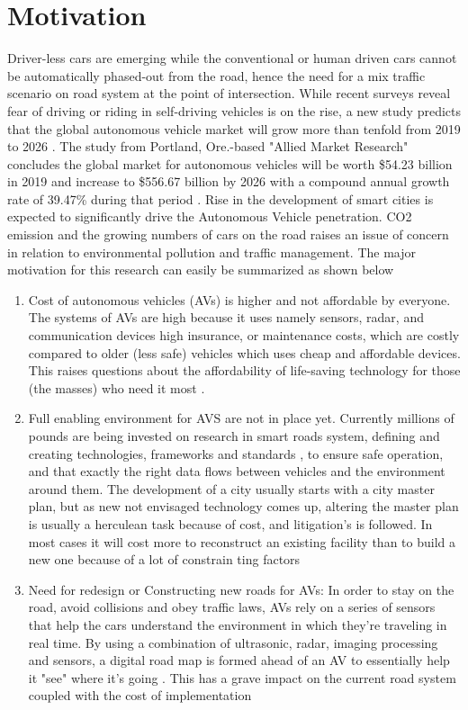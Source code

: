 \documentclass{book}
\begin{document}
\section{Motivation}
\label{sec:motivation}
Driver-less cars are emerging while the conventional or human driven cars cannot be automatically phased-out from the road, hence the need for a mix traffic scenario on road system at the point of intersection. While recent surveys reveal fear of driving or riding in self-driving vehicles is on the rise, a new study predicts that the global autonomous vehicle market will grow more than tenfold from 2019 to 2026 \cite{yun2016relationship}.
The study from Portland, Ore.-based "Allied Market Research"  concludes  the global market for autonomous vehicles will be worth \$54.23 billion in 2019 and increase to \$556.67 billion by 2026 with a compound annual growth rate of 39.47\% during that period \cite{krasniqi2016use, williams2019reliance}. Rise in the development of smart cities is expected to significantly drive the Autonomous Vehicle penetration. CO2 emission and the growing numbers of cars on the road raises an issue of concern in relation to environmental pollution and traffic management. The major motivation for this research can easily be summarized as shown below
\begin{enumerate}
   \item Cost of autonomous vehicles (AVs) is higher and not affordable by everyone. The systems of AVs are high because it uses namely sensors, radar, and communication devices high insurance, or maintenance costs, which are costly compared to older (less safe) vehicles which uses cheap and affordable devices. This raises questions about the affordability of life-saving technology for those (the masses) who need it most \cite{wadud2017fully, childress2015using}.
   \item Full enabling environment for AVS are not in place yet. Currently millions of pounds are being invested on research in smart roads system, defining and creating technologies, frameworks and standards \cite{fagnant2015preparing}, to ensure safe operation, and that exactly the right data flows between vehicles and the environment around them. The development of a city usually starts with a city master plan, but as new not envisaged technology comes up, altering the master plan is usually a herculean task because of cost, and litigation's is followed. In most cases it will cost more to reconstruct an existing facility than to build a new one because of a lot of constrain ting factors \cite{legacy2019planning, bahamonde2018systemic}
   \item Need for redesign or Constructing new roads for AVs: In order to stay on the road, avoid collisions and obey traffic laws, AVs rely on a series of sensors that help the cars understand the environment in which they're traveling in real time. By using a combination of ultrasonic, radar, imaging processing and sensors, a digital road map is formed ahead of an AV to essentially help it "see" where it's going \cite{dickmann2016automotive, essati2016method}. This has a grave impact on the current road system coupled with the cost of implementation
   \end{enumerate}
\end{document}
